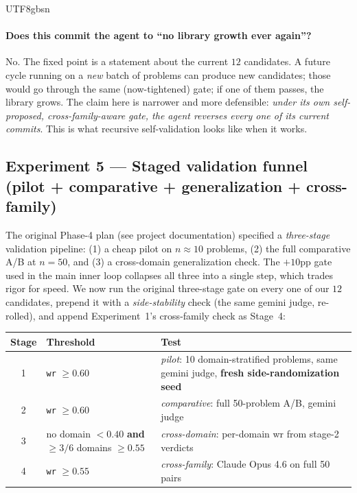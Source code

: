 \documentclass{article}
\begin{document}
\begin{CJK*}{UTF8}{gbsn}
\paragraph{Does this commit the agent to ``no library growth ever
again''?} No. The fixed point is a statement about the current
\(12\) candidates. A future cycle running on a \emph{new} batch of
problems can produce new candidates; those would go through the
same (now-tightened) gate; if one of them passes, the library
grows. The claim here is narrower and more defensible: \emph{under
its own self-proposed, cross-family-aware gate, the agent reverses
every one of its current commits}. This is what recursive
self-validation looks like when it works.

\subsection{Experiment 5 — Staged validation funnel
(pilot + comparative + generalization + cross-family)}
\label{sec:funnel}

The original Phase-4 plan (see project documentation) specified a
\emph{three-stage} validation pipeline: (1) a cheap pilot on
\(n \approx 10\) problems, (2) the full comparative A/B at
\(n = 50\), and (3) a cross-domain generalization check. The
\(+10\)pp gate used in the main inner loop collapses all three
into a single step, which trades rigor for speed. We now run the
original three-stage gate on every one of our \(12\) candidates,
prepend it with a \emph{side-stability} check (the same gemini
judge, re-rolled), and append Experiment~1's cross-family check as
Stage~4:

\begin{center}\small
\begin{tabular}{c l p{7cm}}
  \toprule
  Stage & Threshold & Test \\
  \midrule
  1 & \texttt{wr} $\geq 0.60$ &
    \emph{pilot}: 10 domain-stratified problems, same gemini judge,
    \textbf{fresh side-randomization seed} \\
  2 & \texttt{wr} $\geq 0.60$ &
    \emph{comparative}: full 50-problem A/B, gemini judge \\
  3 & no domain $< 0.40$ \textbf{and} $\geq 3/6$ domains $\geq 0.55$ &
    \emph{cross-domain}: per-domain wr from stage-2 verdicts \\
  4 & \texttt{wr} $\geq 0.55$ &
    \emph{cross-family}: Claude Opus 4.6 on full 50 pairs \\
  \bottomrule
\end{tabular}
\end{center}


\end{CJK*}
\end{document}
